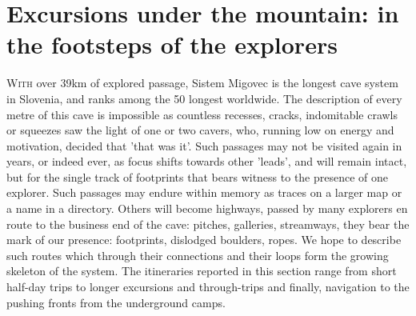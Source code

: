 \vspace{60pt}
\part{Excursions under the mountain: in the footsteps of the explorers}
	\lettrine{W}{ith} over 39km of explored passage, Sistem Migovec is the longest cave system in Slovenia, and ranks among the 50 longest worldwide. The description of every metre of this cave is impossible as countless recesses, cracks, indomitable crawls or squeezes saw the light of one or two cavers, who, running low on energy and motivation, decided that 'that was it'. Such passages may not be visited again in years, or indeed ever, as focus shifts towards other 'leads', and will remain intact, but for the single track of footprints that bears witness to the presence of one explorer. Such passages may endure within memory as traces on a larger map or a name in a directory. Others will become highways, passed by many explorers en route to the business end of the cave: pitches, galleries, streamways, they bear the mark of our presence: footprints, dislodged boulders, ropes. We hope to describe such routes which through their connections and their loops form the growing skeleton of the system. The itineraries reported in this section range from short half-day trips  to longer excursions and through-trips and finally, navigation to the pushing fronts from the underground camps.
